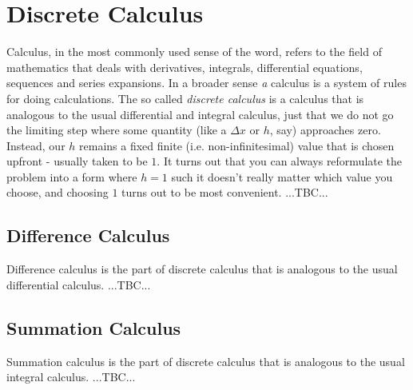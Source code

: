 \chapter{Discrete Calculus}
Calculus, in the most commonly used sense of the word, refers to the field of mathematics that deals with derivatives, integrals, differential equations, sequences and series expansions. In a broader sense \emph{a} calculus is a system of rules for doing calculations. The so called \emph{discrete calculus} is a calculus that is analogous to the usual differential and integral calculus, just that we do not go the limiting step where some quantity (like a $\Delta x$ or $h$, say) approaches zero. Instead, our $h$ remains a fixed finite (i.e. non-infinitesimal) value that is chosen upfront - usually taken to be $1$. It turns out that you can always reformulate the problem into a form where $h = 1$ such it doesn't really matter which value you choose, and choosing $1$ turns out to be most convenient. ...TBC...




\section{Difference Calculus}
Difference calculus is the part of discrete calculus that is analogous to the usual differential calculus. ...TBC...


\section{Summation Calculus}
Summation calculus is the part of discrete calculus that is analogous to the usual integral calculus. ...TBC...



